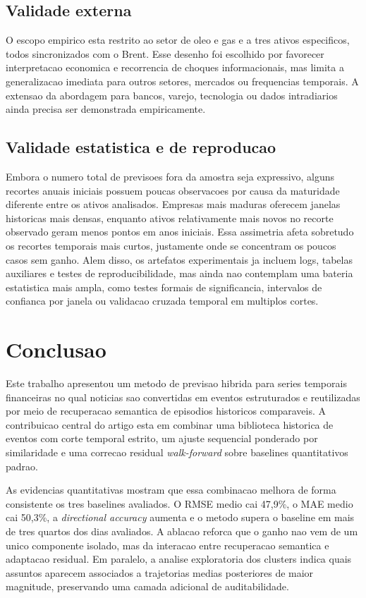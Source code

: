 \documentclass[12pt]{article}
\begin{document}
\subsection{Validade externa}

O escopo empirico esta restrito ao setor de oleo e gas e a tres ativos especificos, todos sincronizados com o Brent. Esse desenho foi escolhido por favorecer interpretacao economica e recorrencia de choques informacionais, mas limita a generalizacao imediata para outros setores, mercados ou frequencias temporais. A extensao da abordagem para bancos, varejo, tecnologia ou dados intradiarios ainda precisa ser demonstrada empiricamente.

\subsection{Validade estatistica e de reproducao}

Embora o numero total de previsoes fora da amostra seja expressivo, alguns recortes anuais iniciais possuem poucas observacoes por causa da maturidade diferente entre os ativos analisados. Empresas mais maduras oferecem janelas historicas mais densas, enquanto ativos relativamente mais novos no recorte observado geram menos pontos em anos iniciais. Essa assimetria afeta sobretudo os recortes temporais mais curtos, justamente onde se concentram os poucos casos sem ganho. Alem disso, os artefatos experimentais ja incluem logs, tabelas auxiliares e testes de reproducibilidade, mas ainda nao contemplam uma bateria estatistica mais ampla, como testes formais de significancia, intervalos de confianca por janela ou validacao cruzada temporal em multiplos cortes.

\section{Conclusao}

Este trabalho apresentou um metodo de previsao hibrida para series temporais financeiras no qual noticias sao convertidas em eventos estruturados e reutilizadas por meio de recuperacao semantica de episodios historicos comparaveis. A contribuicao central do artigo esta em combinar uma biblioteca historica de eventos com corte temporal estrito, um ajuste sequencial ponderado por similaridade e uma correcao residual \textit{walk-forward} sobre baselines quantitativos padrao.

As evidencias quantitativas mostram que essa combinacao melhora de forma consistente os tres baselines avaliados. O RMSE medio cai 47,9\%, o MAE medio cai 50,3\%, a \textit{directional accuracy} aumenta e o metodo supera o baseline em mais de tres quartos dos dias avaliados. A ablacao reforca que o ganho nao vem de um unico componente isolado, mas da interacao entre recuperacao semantica e adaptacao residual. Em paralelo, a analise exploratoria dos clusters indica quais assuntos aparecem associados a trajetorias medias posteriores de maior magnitude, preservando uma camada adicional de auditabilidade.
\end{document}
